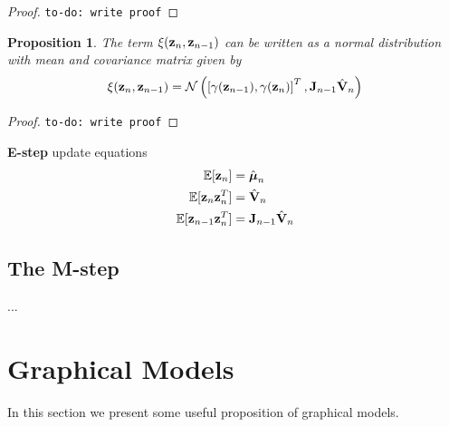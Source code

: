\documentclass[11pt]{article}
\newtheorem{proposition}{Proposition}[section]
\begin{document}
\begin{proof}
	\texttt{to-do: write proof}
\end{proof}

\begin{proposition}
	The term $\xi({\bf z}_n, {\bf z}_{n-1})$ can be written as a normal distribution with mean and covariance matrix given by
	\begin{equation}
		\xi({\bf z}_n, {\bf z}_{n-1}) = \mathcal{N}\left(\left[\gamma({\bf z}_{n-1}), \gamma({\bf z}_{n})\right]^T, {\bf J}_{n-1}\hat{\bf V}_{n}\right)
	\end{equation}
\end{proposition}

\begin{proof}
	\texttt{to-do: write proof}
\end{proof}

\begin{tcolorbox}
\textbf{E-step} update equations
\begin{align}
	\mathbb{E}[{\bf z}_n] &= \hat{\boldsymbol{\mu}}_n\\
	\mathbb{E}[{\bf z}_n {\bf z}_n^T] &= \hat{{\bf V}}_n\\
	\mathbb{E}[{\bf z}_{n-1}{\bf z}_n^T] &= {\bf J}_{n-1}\hat{\bf V}_n
\end{align}
\end{tcolorbox}


\subsection{The M-step}
...

\section{Graphical Models}
In this section we present some useful proposition of graphical models.
\end{document}
